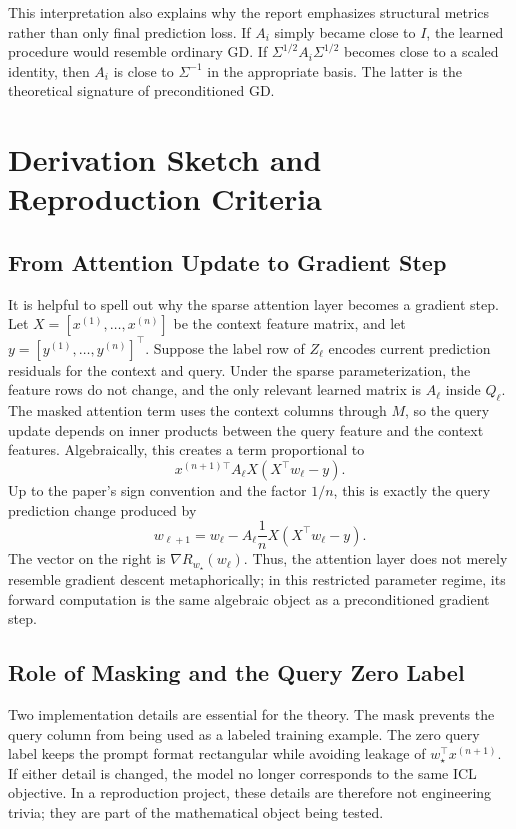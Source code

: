 \documentclass[conference]{IEEEtran}
\newcommand{\wstar}{w_\star}
\begin{document}
This interpretation also explains why the report emphasizes structural metrics rather than only final prediction loss. If $A_i$ simply became close to $I$, the learned procedure would resemble ordinary GD. If $\Sigma^{1/2}A_i\Sigma^{1/2}$ becomes close to a scaled identity, then $A_i$ is close to $\Sigma^{-1}$ in the appropriate basis. The latter is the theoretical signature of preconditioned GD.

\section{Derivation Sketch and Reproduction Criteria}
\subsection{From Attention Update to Gradient Step}
It is helpful to spell out why the sparse attention layer becomes a gradient step. Let $X=[x^{(1)},\ldots,x^{(n)}]$ be the context feature matrix, and let $y=[y^{(1)},\ldots,y^{(n)}]^\top$. Suppose the label row of $Z_\ell$ encodes current prediction residuals for the context and query. Under the sparse parameterization, the feature rows do not change, and the only relevant learned matrix is $A_\ell$ inside $Q_\ell$. The masked attention term uses the context columns through $M$, so the query update depends on inner products between the query feature and the context features. Algebraically, this creates a term proportional to
\begin{equation}
x^{(n+1)\top}A_\ell X\left(X^\top w_\ell-y\right).
\end{equation}
Up to the paper's sign convention and the factor $1/n$, this is exactly the query prediction change produced by
\begin{equation}
w_{\ell+1}=w_\ell-A_\ell\frac{1}{n}X(X^\top w_\ell-y).
\end{equation}
The vector on the right is $\nabla R_{\wstar}(w_\ell)$. Thus, the attention layer does not merely resemble gradient descent metaphorically; in this restricted parameter regime, its forward computation is the same algebraic object as a preconditioned gradient step.

\subsection{Role of Masking and the Query Zero Label}
Two implementation details are essential for the theory. The mask prevents the query column from being used as a labeled training example. The zero query label keeps the prompt format rectangular while avoiding leakage of $\wstar^\top x^{(n+1)}$. If either detail is changed, the model no longer corresponds to the same ICL objective. In a reproduction project, these details are therefore not engineering trivia; they are part of the mathematical object being tested.
\end{document}
